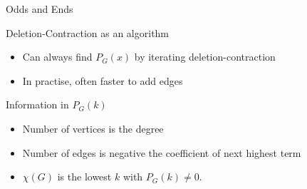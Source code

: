 \documentclass{beamer}
\begin{document}
\begin{frame}{Odds and Ends}
  \begin{block}{Deletion-Contraction as an algorithm}
    \begin{itemize}
    \item Can always find $P_G(x)$ by iterating deletion-contraction
    \item In practise, often faster to add edges
      \end{itemize}
  \end{block}

  \begin{block}{Information in $P_G(k)$}
    \begin{itemize}
    \item Number of vertices is the degree
    \item Number of edges is negative the coefficient of next highest term
      \item $\chi(G)$ is the lowest $k$ with $P_G(k)\neq 0$.
\end{itemize}

    \end{block}





\end{frame}
\end{document}
